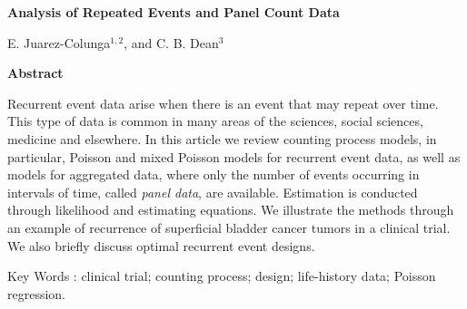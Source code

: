 \documentclass[12pt]{article}
\begin{document}
\begin{titlepage}



\begin{center}

{\bf  Analysis of Repeated Events and Panel Count Data}\\

\vspace{0.8cm}



{E. Juarez-Colunga$^{1, 2}$, and C. B. Dean$^3$ \\
\vspace{1.5cm}
}






\end{center}

\vspace{10cm}



\end{titlepage}



\thispagestyle{empty}

\centerline{\bf Abstract}
\noindent

Recurrent event data arise when there is an event that may repeat over time. This type of data is common in many areas of the sciences, social sciences, medicine and elsewhere.  In this article we review counting process models, in particular, Poisson and mixed Poisson models for recurrent event data, as well as models for aggregated data, where only the number of events occurring in intervals of time, called {\it panel data}, are available.  Estimation is conducted through likelihood and estimating equations. We illustrate the methods through an example of recurrence of superficial bladder cancer tumors in a clinical trial.  We also briefly discuss optimal recurrent event designs.

Key Words : clinical trial; counting process; design; life-history data; Poisson regression.




\end{document}
